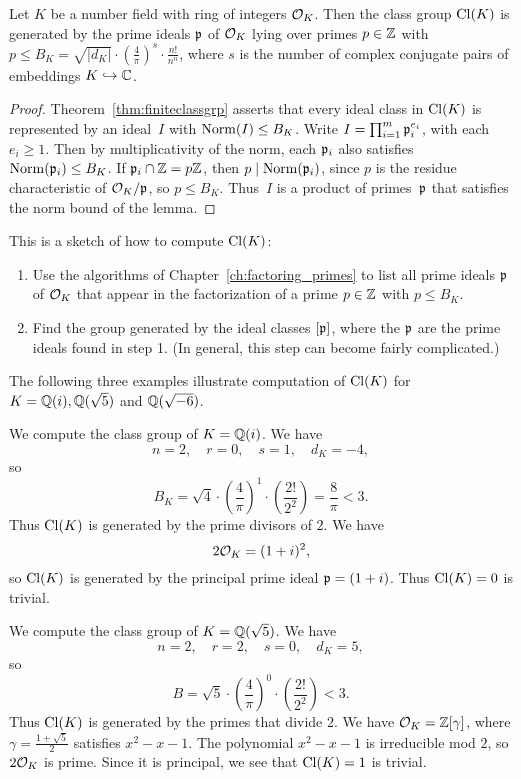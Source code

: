 \begin{lemma}
	Let $K$ be a number field with ring of integers $\mathcal{O}_K$.  Then the
	class group $\operatorname{Cl}(K)$ is generated by the prime ideals $\mathfrak{p}$ of $\mathcal{O}_K$
	lying over primes $p\in\mathbb{Z}$ with $p\leq B_K = \sqrt{|d_K|}\cdot
	\left(\frac{4}{\pi}\right)^s\cdot \frac{n!}{n^n}$,
	where $s$ is the number of complex conjugate pairs of embeddings
	$K\hookrightarrow\mathbb{C}$.
\end{lemma}
\begin{proof}
	Theorem~\ref{thm:finiteclassgrp}
	asserts that every ideal class in $\operatorname{Cl}(K)$ is represented by
	an ideal~$I$ with $\operatorname{Norm}(I)\leq B_K$.  Write $I=\prod_{i=1}^m
	\mathfrak{p}_i^{e_i}$, with each $e_i\geq 1$.  Then by multiplicativity of the
	norm, each $\mathfrak{p}_i$ also satisfies $\operatorname{Norm}(\mathfrak{p}_i)\leq B_K$.  If $\mathfrak{p}_i \cap
	\mathbb{Z}=p\mathbb{Z}$, then $p\mid \operatorname{Norm}(\mathfrak{p}_i)$, since $p$ is the residue
	characteristic of $\mathcal{O}_K/\mathfrak{p}$, so $p\leq B_K$. Thus~$I$ is a product of
	primes~$\mathfrak{p}$ that satisfies the norm bound of the lemma.
\end{proof}

This is a sketch of how to compute $\operatorname{Cl}(K)$:
\begin{enumerate}
	\item Use the algorithms of Chapter~\ref{ch:factoring_primes} to list all
	prime ideals $\mathfrak{p}$ of $\mathcal{O}_K$ that appear in the factorization
	of a prime $p\in \mathbb{Z}$ with $p\leq B_K$.
	\item Find the group generated  by the ideal
	classes $[\mathfrak{p}]$, where the $\mathfrak{p}$ are the prime ideals
	found in step 1.  (In general, this step can become
	fairly complicated.)
\end{enumerate}
The following three examples illustrate computation of $\operatorname{Cl}(K)$
for $K=\mathbb{Q}(i), \mathbb{Q}(\sqrt{5})$ and $\mathbb{Q}(\sqrt{-6})$.
\begin{example}
	We compute the class group of $K=\mathbb{Q}(i)$.  We have
	$$
		n = 2, \quad r=0, \quad s=1, \quad d_K = -4,
	$$
	so
	$$
		B_K = \sqrt{4}\cdot \left(\frac{4}{\pi}\right)^1
		\cdot\left(\frac{2!}{2^2}\right) = \frac{8}{\pi} <3.
	$$
	Thus $\operatorname{Cl}(K)$ is generated by the prime divisors
	of $2$.  We have
	$$
		2\mathcal{O}_K = (1+i)^2,
	$$
	so $\operatorname{Cl}(K)$ is generated by the principal prime
	ideal $\mathfrak{p}=(1+i)$. Thus $\operatorname{Cl}(K)=0$ is trivial.
\end{example}

\begin{example}
	We compute the class group of $K=\mathbb{Q}(\sqrt{5})$.
	We have
	$$
		n = 2, \quad r = 2, \quad s=0, \quad d_K = 5,
	$$
	so
	$$
		B = \sqrt{5}\cdot \left(\frac{4}{\pi}\right)^0
		\cdot \left(\frac{2!}{2^2}\right) < 3.
	$$
	Thus $\operatorname{Cl}(K)$ is generated by the primes that divide $2$.
	We have $\mathcal{O}_K=\mathbb{Z}[\gamma]$, where $\gamma=\frac{1+\sqrt{5}}{2}$
	satisfies $x^2-x-1$.   The polynomial $x^2-x-1$ is irreducible
	mod $2$, so $2\mathcal{O}_K$ is prime.  Since it is principal, we see
	that $\operatorname{Cl}(K)=1$ is trivial.
\end{example}

